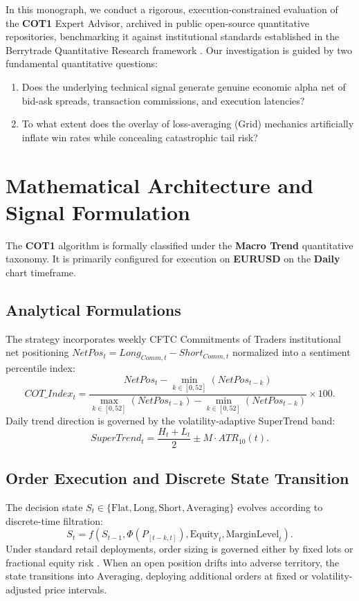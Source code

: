 \documentclass[11pt,a4paper]{article}
\begin{document}
In this monograph, we conduct a rigorous, execution-constrained evaluation of the \textbf{COT1} Expert Advisor, archived in public open-source quantitative repositories, benchmarking it against institutional standards established in the Berrytrade Quantitative Research framework \cite{artsu2026illusion}. Our investigation is guided by two fundamental quantitative questions:
\begin{enumerate}
    \item Does the underlying technical signal generate genuine economic alpha net of bid-ask spreads, transaction commissions, and execution latencies?
    \item To what extent does the overlay of loss-averaging (Grid) mechanics artificially inflate win rates while concealing catastrophic tail risk?
\end{enumerate}

\section{Mathematical Architecture and Signal Formulation}
The \textbf{COT1} algorithm is formally classified under the \textbf{Macro Trend} quantitative taxonomy. It is primarily configured for execution on \textbf{EURUSD} on the \textbf{Daily} chart timeframe.

\subsection{Analytical Formulations}

The strategy incorporates weekly CFTC Commitments of Traders institutional net positioning $NetPos_t = Long_{Comm, t} - Short_{Comm, t}$ normalized into a sentiment percentile index:
\begin{equation}
COT\_Index_t = \frac{NetPos_t - \min_{k \in [0, 52]} (NetPos_{t-k})}{\max_{k \in [0, 52]} (NetPos_{t-k}) - \min_{k \in [0, 52]} (NetPos_{t-k})} \times 100.
\end{equation}
Daily trend direction is governed by the volatility-adaptive SuperTrend band:
\begin{equation}
SuperTrend_t = \frac{H_t + L_t}{2} \pm M \cdot ATR_{10}(t).
\end{equation}


\subsection{Order Execution and Discrete State Transition}
The decision state $S_t \in \{\text{Flat}, \text{Long}, \text{Short}, \text{Averaging}\}$ evolves according to discrete-time filtration:
\begin{equation}
S_{t} = f(S_{t-1}, \Phi(P_{[t-k, t]}), \text{Equity}_t, \text{MarginLevel}_t).
\end{equation}
Under standard retail deployments, order sizing is governed either by fixed lots or fractional equity risk \cite{lopez2018advances, carhart1997persistence}. When an open position drifts into adverse territory, the state transitions into $\text{Averaging}$, deploying additional orders at fixed or volatility-adjusted price intervals.
\end{document}
